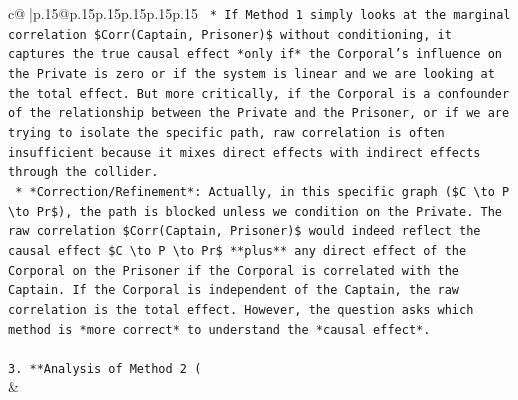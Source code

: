 \documentclass{article}
\begin{document}
{\begin{supertabular}{c@{$\;$}|p{.15\linewidth}@{}p{.15\linewidth}p{.15\linewidth}p{.15\linewidth}p{.15\linewidth}p{.15\linewidth}}
{{{\texttt{    *   If Method 1 simply looks at the marginal correlation \$Corr(Captain, Prisoner)\$ without conditioning, it captures the true causal effect *only if* the Corporal's influence on the Private is zero or if the system is linear and we are looking at the total effect. But more critically, if the Corporal is a confounder of the relationship between the Private and the Prisoner, or if we are trying to isolate the specific path, raw correlation is often insufficient because it mixes direct effects with indirect effects through the collider.} \\
\texttt{    *   *Correction/Refinement*: Actually, in this specific graph (\$C \textbackslash{}to P \textbackslash{}to Pr\$), the path is blocked unless we condition on the Private. The raw correlation \$Corr(Captain, Prisoner)\$ would indeed reflect the causal effect \$C \textbackslash{}to P \textbackslash{}to Pr\$ **plus** any direct effect of the Corporal on the Prisoner if the Corporal is correlated with the Captain. If the Corporal is independent of the Captain, the raw correlation is the total effect. However, the question asks which method is *more correct* to understand the *causal effect*.} \\
\\ 
\texttt{3.  **Analysis of Method 2 (} \\
            }
        }
    }
    & \\ \\


\end{supertabular}}
\end{document}
